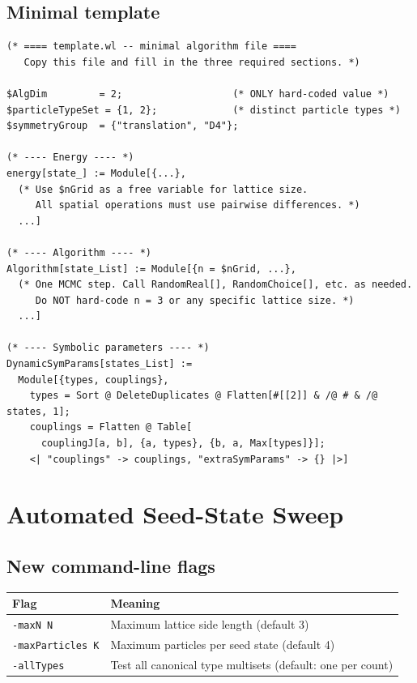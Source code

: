 \documentclass[12pt,a4paper]{article}
\begin{document}
\subsection{Minimal template}

\begin{lstlisting}
(* ==== template.wl -- minimal algorithm file ====
   Copy this file and fill in the three required sections. *)

$AlgDim         = 2;                   (* ONLY hard-coded value *)
$particleTypeSet = {1, 2};             (* distinct particle types *)
$symmetryGroup  = {"translation", "D4"};

(* ---- Energy ---- *)
energy[state_] := Module[{...},
  (* Use $nGrid as a free variable for lattice size.
     All spatial operations must use pairwise differences. *)
  ...]

(* ---- Algorithm ---- *)
Algorithm[state_List] := Module[{n = $nGrid, ...},
  (* One MCMC step. Call RandomReal[], RandomChoice[], etc. as needed.
     Do NOT hard-code n = 3 or any specific lattice size. *)
  ...]

(* ---- Symbolic parameters ---- *)
DynamicSymParams[states_List] :=
  Module[{types, couplings},
    types = Sort @ DeleteDuplicates @ Flatten[#[[2]] & /@ # & /@ states, 1];
    couplings = Flatten @ Table[
      couplingJ[a, b], {a, types}, {b, a, Max[types]}];
    <| "couplings" -> couplings, "extraSymParams" -> {} |>]
\end{lstlisting}

\section{Automated Seed-State Sweep}
\label{sec:sweep}

\subsection{New command-line flags}

\begin{center}
\begin{tabular}{ll}
\toprule
Flag & Meaning \\
\midrule
\texttt{-maxN N} & Maximum lattice side length (default 3) \\
\texttt{-maxParticles K} & Maximum particles per seed state (default 4) \\
\texttt{-allTypes} & Test all canonical type multisets (default: one per
count) \\
\bottomrule
\end{tabular}
\end{center}
\end{document}
